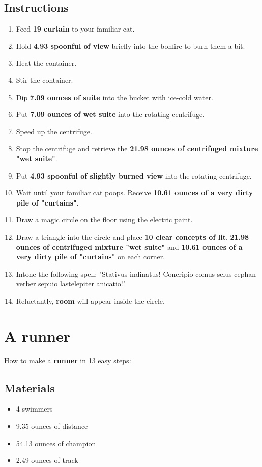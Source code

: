 \documentclass{article}
\begin{document}
\subsection{Instructions}\begin{enumerate}
\item 
Feed \textbf{19 curtain} to your familiar cat.
\item 
Hold \textbf{4.93 spoonful of view} briefly into the bonfire to burn them a bit.
\item 
Heat the container.
\item 
Stir the container.
\item 
Dip \textbf{7.09 ounces of suite} into the bucket with ice-cold water.
\item 
Put \textbf{7.09 ounces of wet suite} into the rotating centrifuge.
\item 
Speed up the centrifuge.
\item 
Stop the centrifuge and retrieve the \textbf{21.98 ounces of centrifuged mixture "wet suite"}.
\item 
Put \textbf{4.93 spoonful of slightly burned view} into the rotating centrifuge.
\item 
Wait until your familiar cat poops. Receive \textbf{10.61 ounces of a very dirty pile of "curtains"}.
\item 
Draw a magic circle on the floor using the electric paint.
\item 
Draw a triangle into the circle and place \textbf{10 clear concepts of lit}, \textbf{21.98 ounces of centrifuged mixture "wet suite"} and \textbf{10.61 ounces of a very dirty pile of "curtains"} on each corner.
\item 
Intone the following spell: "Stativus indinatus! Concripio comus selus cephan verber sepuio lastelepiter anicatio!"
\item 
Reluctantly, \textbf{room} will appear inside the circle.
\end{enumerate}
\newpage
\section{A runner}How to make a \textbf{runner} in 13 easy steps:

\subsection{Materials}\begin{itemize}
\item 
4 swimmers
\item 
9.35 ounces of distance
\item 
54.13 ounces of champion
\item 
2.49 ounces of track
\end{itemize}
\end{document}
